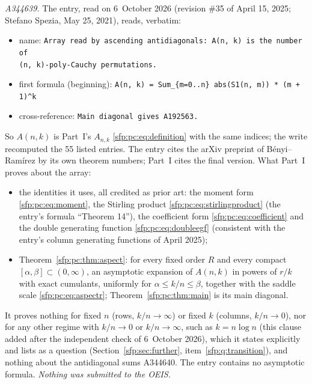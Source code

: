 \documentclass[11pt,letterpaper]{article}
\numberwithin{equation}{section}
\theoremstyle{definition}\newtheorem{definition}[theorem]{Definition}
\theoremstyle{remark}\newtheorem{remark}[theorem]{Remark}
\begin{document}
\emph{A344639.} The entry, read on 6~October 2026 (revision \#35 of April 15, 2025; Stefano Spezia, May 25, 2021), reads, verbatim:
\begin{itemize}
\item name: \verb|Array read by ascending antidiagonals: A(n, k) is the number of|\\
 \verb|(n, k)-poly-Cauchy permutations.|
\item first formula (beginning): \verb|A(n, k) = Sum_{m=0..n} abs(S1(n, m)) * (m + 1)^k|
\item cross-reference: \verb|Main diagonal gives A192563.|
\end{itemize}
So $A(n,k)$ is Part~I's $A_{n,k}$ \eqref{sfp:pc:eq:definition} with the same indices; the write recomputed the 55 listed entries. The entry cites the arXiv preprint of B\'enyi--Ram\'irez by its own theorem numbers; Part~I cites the final version. What Part~I proves about the array:
\begin{itemize}
\item the identities it uses, all credited as prior art: the moment form \eqref{sfp:pc:eq:moment}, the Stirling product \eqref{sfp:pc:eq:stirlingproduct} (the entry's formula ``Theorem 14''), the coefficient form \eqref{sfp:pc:eq:coefficient} and the double generating function \eqref{sfp:pc:eq:doubleegf} (consistent with the entry's column generating functions of April 2025);
\item Theorem~\ref{sfp:pc:thm:aspect}: for every fixed order $R$ and every compact $[\alpha,\beta]\subset(0,\infty)$, an asymptotic expansion of $A(n,k)$ in powers of $r/k$ with exact cumulants, uniformly for $\alpha\le k/n\le\beta$, together with the saddle scale \eqref{sfp:pc:eq:aspectr}; Theorem~\ref{sfp:pc:thm:main} is its main diagonal.
\end{itemize}
It proves nothing for fixed $n$ (rows, $k/n\to\infty$) or fixed $k$ (columns, $k/n\to0$), nor for any other regime with $k/n\to0$ or $k/n\to\infty$, such as $k=n\log n$ \textup{(this clause added after the independent check of 6~October 2026)}, which it states explicitly and lists as a question (Section~\ref{sfp:sec:further}, item~\ref{sfp:q:transition}), and nothing about the antidiagonal sums A344640. The entry contains no asymptotic formula. \emph{Nothing was submitted to the OEIS.}
\end{document}
